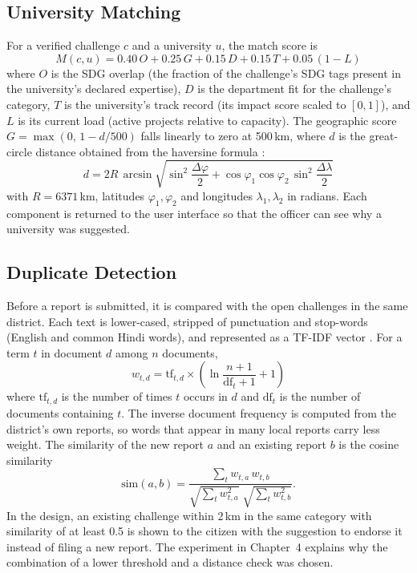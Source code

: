 \subsection{University Matching}
For a verified challenge $c$ and a university $u$, the match score is
\begin{equation}
M(c,u) = 0.40\,O + 0.25\,G + 0.15\,D + 0.15\,T + 0.05\,(1-L)
\end{equation}
where $O$ is the SDG overlap (the fraction of the challenge's SDG tags present in the university's declared expertise), $D$ is the department fit for the challenge's category, $T$ is the university's track record (its impact score scaled to $[0,1]$), and $L$ is its current load (active projects relative to capacity). The geographic score $G = \max(0,\,1 - d/500)$ falls linearly to zero at 500\,km, where $d$ is the great-circle distance obtained from the haversine formula \cite{sinnott1984}:
\begin{equation}
d = 2R\,\arcsin\!\sqrt{\sin^2\!\frac{\Delta\varphi}{2} + \cos\varphi_1\cos\varphi_2\,\sin^2\!\frac{\Delta\lambda}{2}}
\end{equation}
with $R = 6371$\,km, latitudes $\varphi_1,\varphi_2$ and longitudes $\lambda_1,\lambda_2$ in radians. Each component is returned to the user interface so that the officer can see why a university was suggested.

\subsection{Duplicate Detection}\label{sec:dedup}
Before a report is submitted, it is compared with the open challenges in the same district. Each text is lower-cased, stripped of punctuation and stop-words (English and common Hindi words), and represented as a TF-IDF vector \cite{salton1988}. For a term $t$ in document $d$ among $n$ documents,
\begin{equation}
w_{t,d} = \mathrm{tf}_{t,d}\times\left(\ln\frac{n+1}{\mathrm{df}_t+1}+1\right)
\end{equation}
where $\mathrm{tf}_{t,d}$ is the number of times $t$ occurs in $d$ and $\mathrm{df}_t$ is the number of documents containing $t$. The inverse document frequency is computed from the district's own reports, so words that appear in many local reports carry less weight. The similarity of the new report $a$ and an existing report $b$ is the cosine similarity
\begin{equation}
\mathrm{sim}(a,b) = \frac{\sum_t w_{t,a}\,w_{t,b}}{\sqrt{\sum_t w_{t,a}^2}\;\sqrt{\sum_t w_{t,b}^2}}.
\end{equation}
In the design, an existing challenge within 2\,km in the same category with similarity of at least 0.5 is shown to the citizen with the suggestion to endorse it instead of filing a new report. The experiment in Chapter~4 explains why the combination of a lower threshold and a distance check was chosen.


